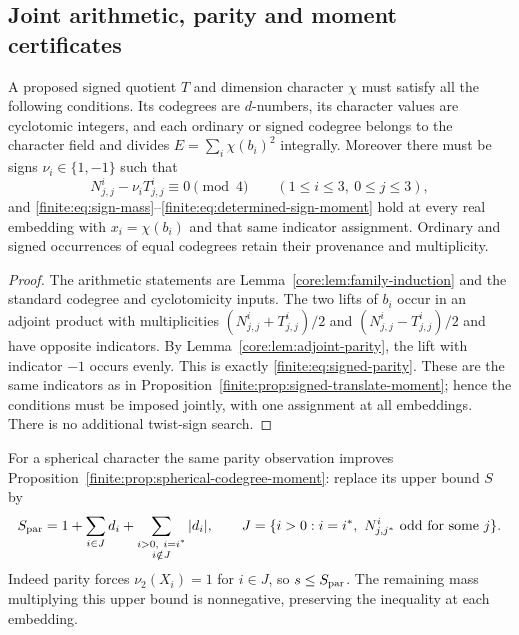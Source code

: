 \subsection{Joint arithmetic, parity and moment certificates}
\label{finite:sec:adjoint-parity}
\begin{theorem}\label{finite:cor:joint-signed-conditions}
A proposed signed quotient $T$ and dimension character $\chi$ must
satisfy all the following conditions. Its codegrees are $d$-numbers,
its character values are cyclotomic integers, and each ordinary or
signed codegree belongs to the character field and divides
$E=\sum_i\chi(b_i)^2$ integrally. Moreover there must be signs
$\nu_i\in\{1,-1\}$ such that
\begin{equation}\label{finite:eq:signed-parity}
 N_{j,j}^{i}-\nu_i T_{j,j}^{i}\equiv0\pmod4\qquad(1\le i\le3,\ 0\le j\le3),
\end{equation}
and \eqref{finite:eq:sign-mass}--\eqref{finite:eq:determined-sign-moment}
hold at every real embedding with $x_i=\chi(b_i)$ and that same
indicator assignment. Ordinary and signed occurrences of equal
codegrees retain their provenance and multiplicity.
\end{theorem}
\begin{proof}
The arithmetic statements are Lemma~\ref{core:lem:family-induction}
and the standard codegree and cyclotomicity inputs. The two lifts
of $b_i$ occur in an adjoint product with multiplicities
$(N_{j,j}^i+T_{j,j}^i)/2$ and $(N_{j,j}^i-T_{j,j}^i)/2$ and have
opposite indicators. By Lemma~\ref{core:lem:adjoint-parity}, the lift
with indicator $-1$ occurs evenly. This is exactly
\eqref{finite:eq:signed-parity}. These are the same indicators as
in Proposition~\ref{finite:prop:signed-translate-moment}; hence the
conditions must be imposed jointly, with one assignment at all
embeddings. There is no additional twist-sign search.
\end{proof}

For a spherical character the same parity observation improves
Proposition~\ref{finite:prop:spherical-codegree-moment}: replace its
upper bound $S$ by
\begin{equation}\label{finite:eq:parity-spherical-bound}
 S_{\rm par}=1+\sum_{i\in J}d_i+
       \sum_{\substack{i>0,\ i=i^*\\i\notin J}}|d_i|,
 \qquad J=\{i>0:i=i^*,\ N_{j,j^*}^{i}\text{ odd for some }j\}.
\end{equation}
Indeed parity forces $\nu_2(X_i)=1$ for $i\in J$, so
$s\le S_{\rm par}$. The remaining mass multiplying this upper bound
is nonnegative, preserving the inequality at each embedding.

